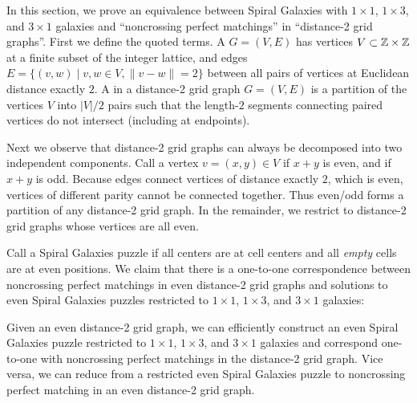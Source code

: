 In this section, we prove an equivalence between Spiral Galaxies with
$1 \times 1$, $1 \times 3$, and $3 \times 1$ galaxies and
``noncrossing perfect matchings'' in ``distance-2 grid graphs''.
First we define the quoted terms.
A  $G = (V, E)$ has vertices $V \subset \mathbb{Z} \times \mathbb{Z}$ at a finite subset of the integer lattice, and edges $E = \{(v,w) \mid v, w \in V, \|v-w\| = 2\}$ between all pairs of vertices at Euclidean distance exactly $2$.
A  in a distance-2 grid graph $G = (V, E)$
is a partition of the vertices $V$ into $|V|/2$ pairs
such that the length-$2$ segments connecting paired vertices
do not intersect (including at endpoints).

Next we observe that distance-2 grid graphs can always be decomposed into two independent components.
Call a vertex $v = (x,y) \in V$  if $x+y$ is even,
and  if $x+y$ is odd.
Because edges connect vertices of distance exactly $2$,
which is even, vertices of different parity cannot be connected together.
Thus even/odd forms a partition of any distance-2 grid graph.
In the remainder, we restrict to  distance-2 grid graphs
whose vertices are all even.

Call a Spiral Galaxies puzzle  if all centers are at cell centers and all \emph{empty} cells are at even positions.
We claim that there is a one-to-one correspondence between noncrossing perfect matchings in even distance-2 grid graphs and solutions to even Spiral Galaxies puzzles restricted to $1\times 1$, $1\times 3$, and $3\times 1$ galaxies:

\begin {lemma} \label {lem:equiv}
  Given an even distance-2 grid graph, we can efficiently construct an even Spiral Galaxies puzzle restricted to $1\times 1$, $1\times 3$, and $3\times 1$ galaxies and correspond one-to-one with noncrossing perfect matchings in the distance-2 grid graph. Vice versa, we can reduce from a restricted even Spiral Galaxies puzzle to noncrossing perfect matching in an even distance-2 grid graph.
\end {lemma}

